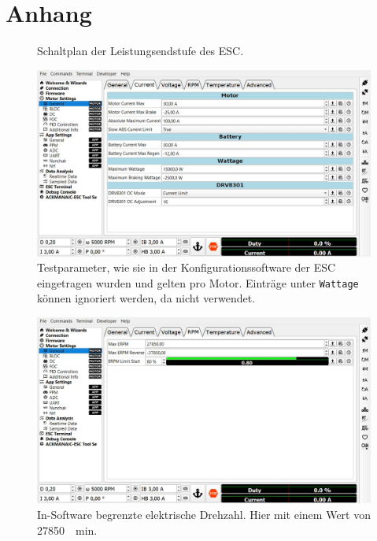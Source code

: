 \appendix
\chapter{Anhang}
	\begin{figure}[h]
		\centering
		
		\caption[Schaltplan der Leistungsendstufe des ESC]{Schaltplan der Leistungsendstufe des ESC\cite{vesc.documentation.2015}.}%
		\label{fig:power mosfets}
	\end{figure}
	\newpage
	\begin{figure}[t]
		\centering
		\includegraphics[width=\textwidth]{Assets/ESC_Motor_Parameters.jpg}
		\caption[Testparameter, wie sie in der Konfigurationssoftware der ESC eingetragen wurden]{Testparameter, wie sie in der Konfigurationssoftware der ESC eingetragen wurden und gelten pro Motor. Einträge unter \texttt{Wattage} können ignoriert werden, da nicht verwendet.}%
		\label{fig:ESC motor params}
	\end{figure}
	\begin{figure}[b]
		\centering
		\includegraphics[width=\textwidth]{Assets/ESC_erpm.jpg}
		\caption[In-Software begrenzte elektrische Drehzahl]{In-Software begrenzte elektrische Drehzahl. Hier mit einem Wert von \qty{27850}{\per\minute}.}%
		\label{fig:ESC erpm setting}
	\end{figure}
